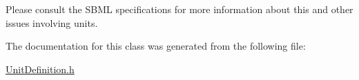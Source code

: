 Please consult the S\+B\+ML specifications for more information about this and other issues involving units. 

The documentation for this class was generated from the following file\+:\begin{DoxyCompactItemize}
\item 
\hyperlink{_unit_definition_8h}{Unit\+Definition.\+h}\end{DoxyCompactItemize}
